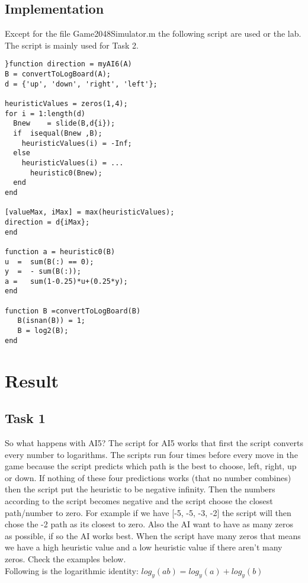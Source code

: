 \documentclass[a4paper,12pt]{article}
\begin{document}
\subsection{Implementation}
Except for the file Game2048Simulator.m the following script are used or the lab. The script is mainly used for Task 2.
{\setlength{\parindent}{0cm}
}
\begin{lstlisting}
}function direction = myAI6(A)
B = convertToLogBoard(A);  
d = {'up', 'down', 'right', 'left'};

heuristicValues = zeros(1,4);
for i = 1:length(d)
  Bnew    = slide(B,d{i}); 
  if  isequal(Bnew ,B);             
    heuristicValues(i) = -Inf;
  else
    heuristicValues(i) = ...
      heuristic0(Bnew);
  end
end

[valueMax, iMax] = max(heuristicValues);  
direction = d{iMax};
end

function a = heuristic0(B)
u  =  sum(B(:) == 0);
y  =  - sum(B(:));
a =   sum(1-0.25)*u+(0.25*y);
end

function B =convertToLogBoard(B)
   B(isnan(B)) = 1;
   B = log2(B);
end
\end{lstlisting}


\section{Result}
\subsection{Task 1}
So what happens with AI5? The script for AI5 works that first the script converts every number to logarithms. The scripts run four times before every move in the game because the script predicts which path is the best to choose, left, right, up or down. If nothing of these four predictions works (that no number combines) then the script put the heuristic to be negative infinity. Then the numbers according to the script becomes negative and the script choose the closest path/number to zero. For example if we have [-5, -5, -3, -2] the script will then chose the -2 path as its closest to zero. Also the AI want to have as many zeros as possible, if so the AI works best. When the script have many zeros that means we have a high heuristic value and a low heuristic value if there aren't many zeros. Check the examples below.
\\

Following is the logarithmic identity:
\begin{math}
log_{y}(ab) = log_{y}(a) + log_{y}(b)
\end{math}
\\
\end{document}
